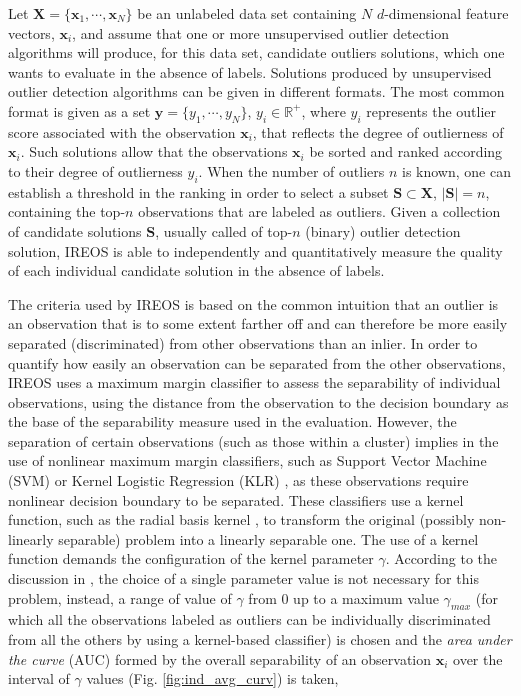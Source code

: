 Let $\mathbf{X} = \{\mathbf{x}_1, \cdots, \mathbf{x}_N \}$ be an unlabeled data set containing $N$ $d$-dimensional feature vectors, $\mathbf{x}_i$, and assume that one or more unsupervised outlier detection algorithms will produce, for this data set, candidate outliers solutions, which one wants to evaluate in the absence of labels. Solutions produced by unsupervised outlier detection algorithms can be given in different formats. The most common format is given as a set $\mathbf{y} = \{ y_1, \cdots, y_N \}$, $y_i \in \mathbb{R}^+$, where $y_i$ represents the outlier score associated with the observation $\mathbf{x}_i$, that reflects the degree of outlierness of $\mathbf{x}_i$. Such solutions allow that the observations $\mathbf{x}_i$ be sorted and ranked according to their degree of outlierness $y_i$. When the number of outliers $n$ is known, one can establish a threshold in the ranking in order to select a subset $\mathbf{S} \subset \mathbf{X}$, $|\mathbf{S}| = n$, containing the top-$n$ observations that are labeled as outliers. Given a collection of candidate solutions $\mathbf{S}$, usually called of top-$n$ (binary) outlier detection solution, IREOS \cite{marques2015} is able to independently and quantitatively measure the quality of each individual candidate solution in the absence of labels.

The criteria used by IREOS is based on the common intuition that an outlier is an observation that is to some extent farther off and can therefore be more easily separated (discriminated) from other observations than an inlier. In order to quantify how easily an observation can be separated from the other observations, IREOS uses a maximum margin classifier \cite{bishop2006,hastie2013} to assess the separability of individual observations, using the distance from the observation to the decision boundary as the base of the separability measure used in the evaluation. However, the separation of certain observations (such as those within a cluster) implies in the use of nonlinear maximum margin classifiers, such as Support Vector Machine (SVM) or Kernel Logistic Regression (KLR) \cite{bishop2006,hastie2013}, as these observations require nonlinear decision boundary to be separated. These classifiers use a kernel function, such as the radial basis kernel \cite{scholkopf2001}, to transform the original (possibly non-linearly separable) problem into a linearly separable one. The use of a kernel function demands the configuration of the kernel parameter $\gamma$. According to the discussion in \citep{marques2015}, the choice of a single parameter value is not necessary for this problem, instead, a range of value of $\gamma$ from 0 up to a maximum value $\gamma_{max}$ (for which all the observations labeled as outliers can be individually discriminated from all the others by using a kernel-based classifier) is chosen and the \textit{area under the curve} (AUC) formed by the overall separability of an observation $\mathbf{x}_i$ over the interval of $\gamma$ values (Fig. \ref{fig:ind_avg_curv}) is taken,

